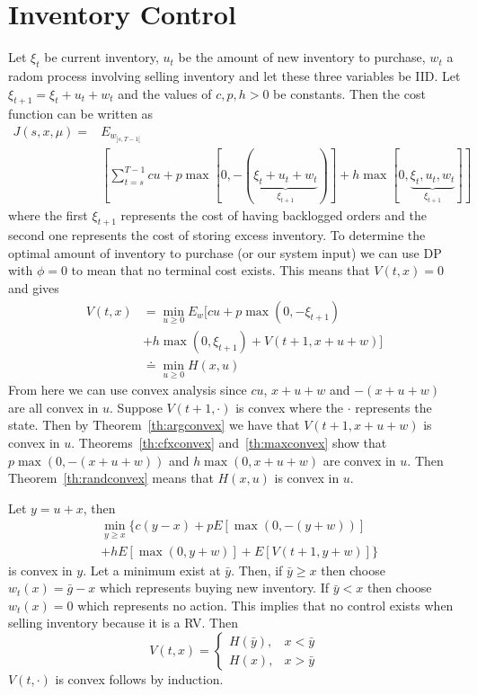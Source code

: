 \section{Inventory Control}
Let $\xi_t$ be current inventory, $u_t$ be the amount of new inventory to purchase, $w_t$ a radom process involving selling inventory and let these three variables be IID\@.
Let $\xi_{t+1} = \xi_t+u_t+w_t$ and the values of $c,p,h>0$ be constants.
Then the cost function can be written as
\begin{align*}
J(s,x,\mu) =& E_{w_{]s,T-1[}} \\%
&\left[\sum_{t=s}^{T-1}cu+p\max[0,-(\underbrace{\xi_t+u_t+w_t}_{\xi_{t+1}})] + h\max[0,\underbrace{\xi_t,u_t,w_t}_{\xi_{t+1}}] \right]
\end{align*}
where the first $\xi_{t+1}$ represents the cost of having backlogged orders and the second one represents the cost of storing excess inventory.
To determine the optimal amount of inventory to purchase (or our system input) we can use DP with $\phi=0$ to mean that no terminal cost exists.
This means that $V(t,x)=0$ and gives
\begin{align*}
V(t,x) &= \min_{u\geq 0}E_w[cu+p\max(0,-\xi_{t+1}) \\
&+ h\max(0,\xi_{t+1}) + V(t+1,x+u+w)] \\
&\doteq \min_{u\geq 0}H(x,u)
\end{align*}
From here we can use convex analysis since $cu$, $x+u+w$ and $-(x+u+w)$ are all convex in $u$.
Suppose $V(t+1,\cdot)$ is convex where the $\cdot$ represents the state.
Then by Theorem~\ref{th:argconvex} we have that $V(t+1,x+u+w)$ is convex in $u$.
Theorems~\ref{th:cfxconvex} and~\ref{th:maxconvex} show that $p\max(0,-(x+u+w))$ and $h\max(0,x+u+w)$ are convex in $u$.
Then Theorem~\ref{th:randconvex} means that $H(x,u)$ is convex in $u$.

Let $y=u+x$, then
\begin{align*}
&\min_{y\geq x}\{ c(y-x)+pE[\max(0,-(y+w))] \\
&+ hE[\max(0,y+w)] + E[V(t+1,y+w)]\}
\end{align*}
is convex in $y$.
Let a minimum exist at $\bar{y}$.
Then, if $\bar{y}\geq x$ then choose $w_t(x) = \bar{g}-x$ which represents buying new inventory.
If $\bar{y}<x$ then choose $w_t(x)=0$ which represents no action.
This implies that no control exists when selling inventory because it is a RV\@.
Then
$$V(t,x) = \begin{cases} H(\bar{y}), & x<\bar{y} \\ H(x), & x>\bar{y} \end{cases}$$
$V(t,\cdot)$ is convex follows by induction.%
